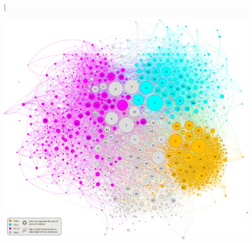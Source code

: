 \documentclass{article}
\begin{document}
\twocolumn[{%
	\begin{center}
		\vspace{-3em}
		\vspace{1em}
		\includegraphics[width=0.9\linewidth]{institution_network_top_1000_with_legend.pdf}
		\label{fig:cn_eu_us_top_1000_institutions}
		\vspace{2em}
		

\end{center}}
\end{document}
